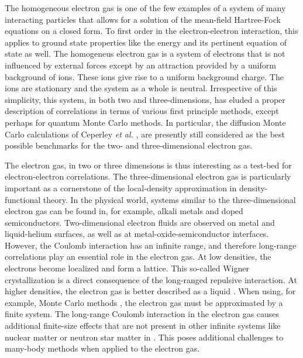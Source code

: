 \documentclass[aps,twocolumn,showpacs,floatfix,nofootinbib,preprintnumbers,superscriptaddress,amsmath,amssymb]{revtex4-1}
\begin{document}
The homogeneous electron gas is one of the few examples of a system of many
interacting particles that allows for a solution of the mean-field
Hartree-Fock equations on a closed form.  To first order in the
electron-electron interaction, this applies to ground state properties
like the energy and its pertinent equation of state as well.  The
homogeneus electron gas is a system of electrons that is not
influenced by external forces except by an attraction provided by a
uniform background of ions. These ions give rise to a uniform
background charge.  The ions are stationary and the system as a whole
is neutral.
Irrespective of this simplicity, this system, in both two and
three-dimensions, has eluded a proper description of correlations in
terms of various first principle methods, except perhaps for quantum
Monte Carlo methods. In particular, the diffusion Monte Carlo
calculations of Ceperley {\em et al.}
\cite{ceperley1980,tanatar1989}, are presently still considered as the
best possible benchmarks for the two- and three-dimensional electron
gas. 

The electron gas, in 
two or three dimensions is thus interesting as a test-bed for 
electron-electron correlations. The three-dimensional 
electron gas is particularly important as a cornerstone 
of the local-density approximation in density-functional 
theory. In the physical world, systems 
similar to the three-dimensional electron gas can be 
found in, for example, alkali metals and doped 
semiconductors. Two-dimensional electron fluids are 
observed on metal and liquid-helium surfaces, as well as 
at metal-oxide-semiconductor interfaces. However, the Coulomb 
interaction has an infinite range, and therefore 
long-range correlations play an essential role in the
electron gas. At low densities, the electrons become 
localized and form a lattice. This so-called Wigner 
crystallization \cite{wigner1934} is a direct consequence 
of the long-ranged repulsive interaction. At higher
densities, the electron gas is better described as a
liquid \cite{ceperley1978,ceperley1980,tanatar1989,bishop1982}. 
When using, for example, Monte Carlo methods 
\cite{foulkes2001}, the electron gas must be approximated 
by a finite system. The long-range Coulomb interaction 
in the electron gas causes additional finite-size effects 
\cite{fraser1996,chiesa2006,drummond2008} that are not
present in other infinite systems like nuclear matter or neutron star matter in 
\cite{hagen2014}. 
This poses additional challenges to many-body methods when applied 
to the electron gas.
\end{document}
